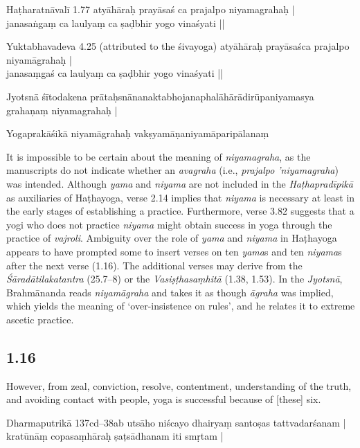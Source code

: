 \begin{ekdosis}
\begin{testimonia}[hp01_015]
Haṭharatnāvalī 1.77
\startverse
atyāhāraḥ prayāsaś ca prajalpo niyamagrahaḥ |\\
janasaṅgaṃ ca laulyaṃ ca ṣaḍbhir yogo vinaśyati ||
\endverse

Yuktabhavadeva 4.25 (attributed to the śivayoga)
\startverse
atyāhāraḥ prayāsaśca prajalpo niyamāgrahaḥ |\\
janasaṃgaś ca laulyaṃ ca ṣaḍbhir yogo vinaśyati ||
\endverse

Jyotsnā
\startverse
śītodakena prātaḥsnānanaktabhojanaphalāhārādirūpaniyamasya grahaṇaṃ niyamagrahaḥ |
\endverse

Yogaprakāśikā
\startverse
niyamāgrahaḥ vakṣyamāṇaniyamāparipālanaṃ
\endverse
\end{testimonia}

\begin{philcomm}[hp01_015]        
It is impossible to be certain about the meaning of \emph{niyamagraha}, as the manuscripts do not indicate whether an \emph{avagraha} (i.e., \emph{prajalpo ’niyamagraha}) was intended. Although \emph{yama} and \emph{niyama} are not included in the \emph{Haṭhapradīpikā} as auxiliaries of Haṭhayoga, verse 2.14 implies that \emph{niyama} is necessary at least in the early stages of establishing a practice. Furthermore, verse 3.82 suggests that a yogi who does not practice \emph{niyama} might obtain success in yoga through the practice of \textit{vajroli}. Ambiguity over the role of \emph{yama} and \emph{niyama} in Haṭhayoga appears to have prompted some to insert verses on ten \emph{yama}s and ten \emph{niyama}s after the next verse (1.16). The additional verses may derive from the \emph{Śāradātilakatantra} (25.7–8) or the  \emph{Vasiṣṭhasaṃhitā} (1.38, 1.53). In the \emph{Jyotsnā}, Brahmānanda reads \emph{niyamāgraha} and takes it as though \emph{āgraha} was implied, which yields the meaning of ‘over-insistence on rules’, and he relates it to extreme ascetic practice.
\end{philcomm}

\subsection*{1.16}
\begin{translation}[hp01_016]
However, from zeal, conviction, resolve, contentment, understanding of the truth, and avoiding contact with people, yoga is successful because of [these] six.
\end{translation}

\begin{sources}[hp01_016]
Dharmaputrikā 137cd–38ab%
\startverse
utsāho niścayo dhairyaṃ santoṣas tattvadarśanam | \\
kratūnāṃ copasaṃhāraḥ ṣaṭsādhanam iti smṛtam |
\endverse


\end{sources}
\end{ekdosis}
